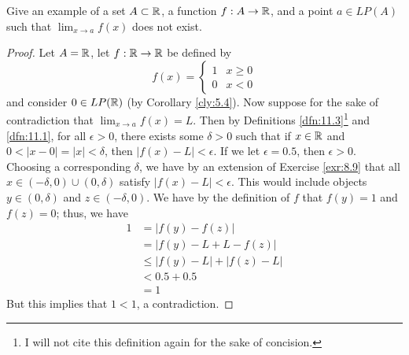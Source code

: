 \documentclass[../main.tex]{subfiles}
\begin{document}
\begin{exercise}\label{exr:11.4}
    Give an example of a set $A\subset\mathbb{R}$, a function $f:A\to\mathbb{R}$, and a point $a\in LP(A)$ such that $\lim_{x\to a}f(x)$ does not exist.
    \begin{proof}
        Let $A=\mathbb{R}$, let $f:\mathbb{R}\to\mathbb{R}$ be defined by
        \begin{equation*}
            f(x) =
            \begin{cases}
                1 & x\geq 0\\
                0 & x<0
            \end{cases}
        \end{equation*}
        and consider $0\in LP(\mathbb{R})$ (by Corollary \ref{cly:5.4}). Now suppose for the sake of contradiction that $\lim_{x\to a}f(x)=L$. Then by Definitions \ref{dfn:11.3}\footnote{I will not cite this definition again for the sake of concision.} and \ref{dfn:11.1}, for all $\epsilon>0$, there exists some $\delta>0$ such that if $x\in\mathbb{R}$ and $0<|x-0|=|x|<\delta$, then $|f(x)-L|<\epsilon$. If we let $\epsilon=0.5$, then $\epsilon>0$. Choosing a corresponding $\delta$, we have by an extension of Exercise \ref{exr:8.9} that all $x\in(-\delta,0)\cup(0,\delta)$ satisfy $|f(x)-L|<\epsilon$. This would include objects $y\in(0,\delta)$ and $z\in(-\delta,0)$. We have by the definition of $f$ that $f(y)=1$ and $f(z)=0$; thus, we have
        \begin{align*}
            1 &= |f(y)-f(z)|\\
            &= |f(y)-L+L-f(z)|\\
            &\leq |f(y)-L|+|f(z)-L|\\
            &< 0.5+0.5\\
            &= 1
        \end{align*}
        But this implies that $1<1$, a contradiction.
    \end{proof}
\end{exercise}
\end{document}
